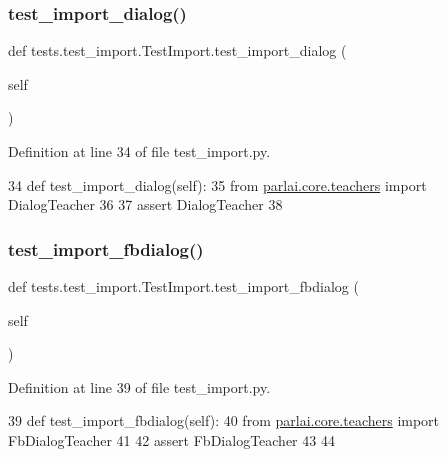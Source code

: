 \subsubsection{\texorpdfstring{test\+\_\+import\+\_\+dialog()}{test\_import\_dialog()}}
{\footnotesize\ttfamily def tests.\+test\+\_\+import.\+Test\+Import.\+test\+\_\+import\+\_\+dialog (\begin{DoxyParamCaption}\item[{}]{self }\end{DoxyParamCaption})}



Definition at line 34 of file test\+\_\+import.\+py.


\begin{DoxyCode}
34     \textcolor{keyword}{def }test\_import\_dialog(self):
35         \textcolor{keyword}{from} \hyperlink{namespaceparlai_1_1core_1_1teachers}{parlai.core.teachers} \textcolor{keyword}{import} DialogTeacher
36 
37         \textcolor{keyword}{assert} DialogTeacher
38 
\end{DoxyCode}
\mbox{\label{classtests_1_1test__import_1_1TestImport_ad030b185d0f0b02e1d8606d578d48820}} 
\subsubsection{\texorpdfstring{test\+\_\+import\+\_\+fbdialog()}{test\_import\_fbdialog()}}
{\footnotesize\ttfamily def tests.\+test\+\_\+import.\+Test\+Import.\+test\+\_\+import\+\_\+fbdialog (\begin{DoxyParamCaption}\item[{}]{self }\end{DoxyParamCaption})}



Definition at line 39 of file test\+\_\+import.\+py.


\begin{DoxyCode}
39     \textcolor{keyword}{def }test\_import\_fbdialog(self):
40         \textcolor{keyword}{from} \hyperlink{namespaceparlai_1_1core_1_1teachers}{parlai.core.teachers} \textcolor{keyword}{import} FbDialogTeacher
41 
42         \textcolor{keyword}{assert} FbDialogTeacher
43 
44 
\end{DoxyCode}
\mbox{\label{classtests_1_1test__import_1_1TestImport_af48db1b740c81424df27e10c66481770}} 
